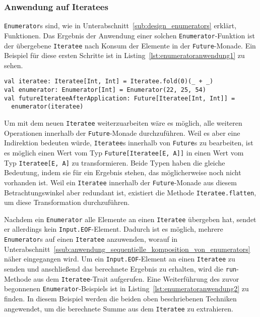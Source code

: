 \subsubsection{Anwendung auf Iteratees} %
\label{ssub:anwendung_auf_iteratees}

\lstinline|Enumerator|s sind, wie in Unterabschnitt~\ref{sub:design_enumerators} erklärt, Funktionen.
Das Ergebnis der Anwendung einer solchen \lstinline|Enumerator|-Funktion ist der übergebene \lstinline|Iteratee| nach Konsum der Elemente in der \lstinline|Future|-Monade.
Ein Beispiel für diese ersten Schritte ist in Listing~\ref{lst:enumeratoranwendung1} zu sehen.

\begin{lstlisting}[caption=Anwendung eines Enumerators auf einen Iteratee, label=lst:enumeratoranwendung1]
val iteratee: Iteratee[Int, Int] = Iteratee.fold(0)(_ + _)
val enumerator: Enumerator[Int] = Enumerator(22, 25, 54)
val futureIterateeAfterApplication: Future[Iteratee[Int, Int]] =
  enumerator(iteratee)
\end{lstlisting}


Um mit dem neuen \lstinline|Iteratee| weiterzuarbeiten wäre es möglich, alle weiteren Operationen innerhalb der \lstinline|Future|-Monade durchzuführen.
Weil es aber eine Indirektion bedeuten würde, \lstinline|Iteratee|s innerhalb von \lstinline|Future|s zu bearbeiten, ist es möglich einen Wert vom Typ \lstinline|Future[Iteratee[E, A]]| in einen Wert vom Typ \lstinline|Iteratee[E, A]| zu transformieren.
Beide Typen haben die gleiche Bedeutung, indem sie für ein Ergebnis stehen, das möglicherweise noch nicht vorhanden ist.
Weil ein \lstinline|Iteratee| innerhalb der \lstinline|Future|-Monade aus diesem Betrachtungswinkel aber redundant ist, existiert die Methode \lstinline|Iteratee.flatten|, um diese Transformation durchzuführen.


Nachdem ein \lstinline|Enumerator| alle Elemente an einen \lstinline|Iteratee| übergeben hat, sendet er allerdings kein \lstinline|Input.EOF|-Element.
Dadurch ist es möglich, mehrere \lstinline|Enumerator|s auf einen \lstinline|Iteratee| anzuwenden, worauf in Unterabschnitt~\ref{ssub:anwendung_sequentielle_komposition_von_enumerators} näher eingegangen wird.
Um ein \lstinline|Input.EOF|-Element an einen \lstinline|Iteratee| zu senden und anschließend das berechnete Ergebnis zu erhalten, wird die \lstinline|run|-Methode aus dem \lstinline|Iteratee|-Trait aufgerufen.
Eine Weiterführung des zuvor begonnenen \lstinline|Enumerator|-Beispiels ist in Listing~\ref{lst:enumeratoranwendung2} zu finden.
In diesem Beispiel werden die beiden oben beschriebenen Techniken angewendet, um die berechnete Summe aus dem \lstinline|Iteratee| zu extrahieren.

